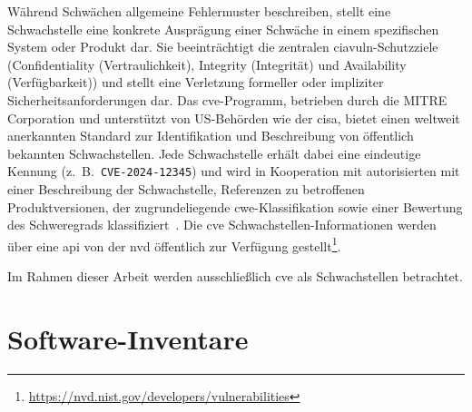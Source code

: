 Während Schwächen allgemeine Fehlermuster beschreiben, stellt eine Schwachstelle eine konkrete Ausprägung einer Schwäche in einem spezifischen System oder Produkt dar.
Sie beeinträchtigt die zentralen \acrshort{ciavuln}-Schutzziele (Confidentiality (Vertraulichkeit), Integrity (Integrität) und Availability (Verfügbarkeit)) und stellt eine Verletzung formeller oder impliziter Sicherheitsanforderungen dar.
Das \acrshort{cve}-Programm, betrieben durch die MITRE Corporation und unterstützt von US-Behörden wie der \acrfull{cisa}, bietet einen weltweit anerkannten Standard zur Identifikation und Beschreibung von öffentlich bekannten Schwachstellen.
Jede Schwachstelle erhält dabei eine eindeutige Kennung (z.\ B.\ \verb+CVE-2024-12345+) und wird in Kooperation mit autorisierten  mit einer Beschreibung der Schwachstelle, Referenzen zu betroffenen Produktversionen, der zugrundeliegende \acrshort{cwe}-Klassifikation sowie einer Bewertung des Schweregrads klassifiziert\ \autocite{Ross_Winstead_McEvilley_2022, CveGlossaryCommonVulnerabilitiesAndExposures12mai2025}.
Die \acrshort{cve} Schwachstellen-Informationen werden über eine \acrshort{api} von der \acrshort{nvd} öffentlich zur Verfügung gestellt\footnote{\url{https://nvd.nist.gov/developers/vulnerabilities}}.

Im Rahmen dieser Arbeit werden ausschließlich \acrshort{cve} als Schwachstellen betrachtet.







\section{Software-Inventare}\label{sec:def-inventories}

